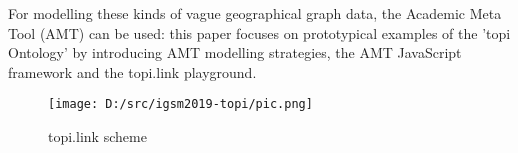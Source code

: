 \documentclass[a4paper]{article}
\begin{document}
For modelling these kinds of vague geographical graph data, the Academic Meta Tool\cite{unold_academic_2019} (AMT) can be used: this paper focuses on prototypical examples of the 'topi Ontology'\cite{thiery_zenodo_2} by introducing AMT modelling strategies, the AMT JavaScript framework\cite{thiery_zenodo_3} and the topi.link playground\cite{thiery_topilink_2019}.


\begin{figure}[!htb]
	\centering
		\texttt{[image: D:/src/igsm2019-topi/pic.png]}
	\caption{topi.link scheme}
	\label{topilinkscheme}
\end{figure}



\end{document}
